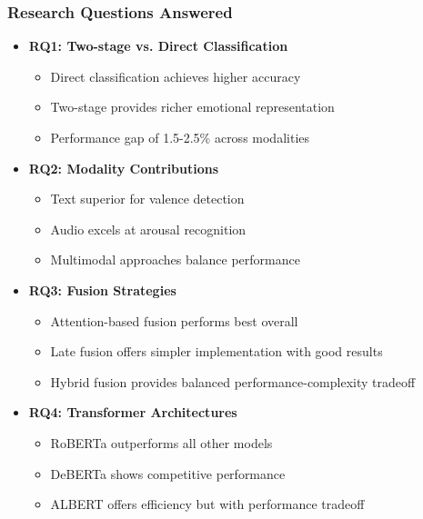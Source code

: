 \begin{frame}
\frametitle{Research Questions Answered}
\begin{itemize}
    \item \textbf{RQ1: Two-stage vs. Direct Classification}
    \begin{itemize}
        \item Direct classification achieves higher accuracy
        \item Two-stage provides richer emotional representation
        \item Performance gap of 1.5-2.5\% across modalities
    \end{itemize}
    \item \textbf{RQ2: Modality Contributions}
    \begin{itemize}
        \item Text superior for valence detection
        \item Audio excels at arousal recognition
        \item Multimodal approaches balance performance
    \end{itemize}
    \item \textbf{RQ3: Fusion Strategies}
    \begin{itemize}
        \item Attention-based fusion performs best overall
        \item Late fusion offers simpler implementation with good results
        \item Hybrid fusion provides balanced performance-complexity tradeoff
    \end{itemize}
    \item \textbf{RQ4: Transformer Architectures}
    \begin{itemize}
        \item RoBERTa outperforms all other models
        \item DeBERTa shows competitive performance
        \item ALBERT offers efficiency but with performance tradeoff
    \end{itemize}
\end{itemize}
\end{frame}

